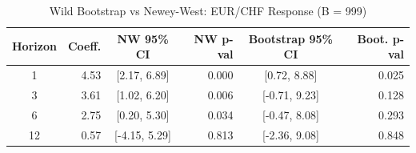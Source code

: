 \begin{table}[ht]
\centering
\caption{Wild Bootstrap vs Newey-West: EUR/CHF Response (B = 999)} 
\label{tab:bootstrap_comparison}
\begin{tabular}{crcrcr}
  \toprule
Horizon & Coeff. & NW 95\% CI & NW p-val & Bootstrap 95\% CI & Boot. p-val \\ 
  \midrule
  1 & 4.53 & [2.17, 6.89] & 0.000 & [0.72, 8.88] & 0.025 \\ 
    3 & 3.61 & [1.02, 6.20] & 0.006 & [-0.71, 9.23] & 0.128 \\ 
    6 & 2.75 & [0.20, 5.30] & 0.034 & [-0.47, 8.08] & 0.293 \\ 
   12 & 0.57 & [-4.15, 5.29] & 0.813 & [-2.36, 9.08] & 0.848 \\ 
   \bottomrule
\end{tabular}
\end{table}
